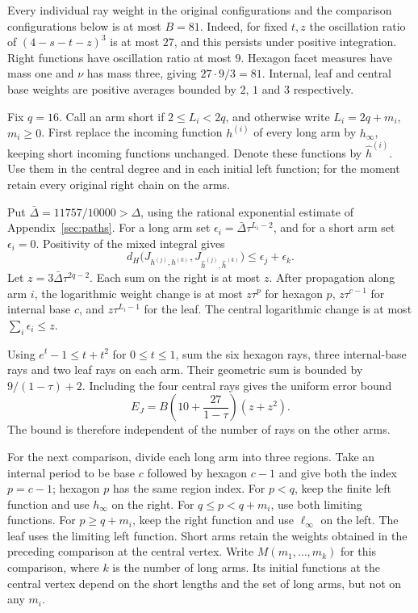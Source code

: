 Every individual ray weight in the original configurations and the
comparison configurations below is at most $B=81$. Indeed, for fixed $t,z$
the oscillation ratio of $(4-s-t-z)^3$ is at most $27$, and this persists
under positive integration. Right functions have oscillation ratio
at most $9$. Hexagon facet measures have mass one and $\nu$ has mass
three, giving $27\cdot9/3=81$. Internal, leaf and central base weights
are positive averages bounded by $2$, $1$ and $3$ respectively.

Fix $q=16$. Call an arm short if $2\le L_i<2q$, and otherwise write
$L_i=2q+m_i$, $m_i\ge0$. First replace the incoming function $h^{(i)}$
of every long arm by $h_\infty$, keeping short incoming functions
unchanged. Denote these functions by $\widehat h^{(i)}$. Use them in
the central degree and in each initial left function; for the moment
retain every original right chain on the arms.

Put $\bar\Delta=11757/10000>\Delta$, using the rational exponential
estimate of Appendix~\ref{sec:paths}. For a long arm set
$\epsilon_i=\bar\Delta\tau^{L_i-2}$, and for a short arm set
$\epsilon_i=0$. Positivity of the mixed integral gives
\[
 d_H\bigl(J_{h^{(j)},h^{(k)}},
          J_{\widehat h^{(j)},\widehat h^{(k)}}\bigr)
 \le\epsilon_j+\epsilon_k.
\]
Let $z=3\bar\Delta\tau^{2q-2}$. Each sum on the right is at most $z$.
After propagation along arm $i$, the logarithmic weight change is at
most $z\tau^p$ for hexagon $p$, $z\tau^{c-1}$ for internal base $c$,
and $z\tau^{L_i-1}$ for the leaf. The central logarithmic change is
at most $\sum_i\epsilon_i\le z$.

Using $e^t-1\le t+t^2$ for $0\le t\le1$, sum the six hexagon rays,
three internal-base rays and two leaf rays on each arm. Their geometric
sum is bounded by $9/(1-\tau)+2$. Including the four central rays gives
the uniform error bound
\begin{equation}\label{spider:junction-error}
 E_J=B\left(10+\frac{27}{1-\tau}\right)(z+z^2).
\end{equation}
The bound is therefore independent of the number of rays on the other arms.

For the next comparison, divide each long arm into three regions. Take an
internal period to be base $c$ followed by hexagon $c-1$ and give both the
index $p=c-1$;
hexagon $p$ has the same region index. For $p<q$, keep the finite left
function and use $h_\infty$ on the right. For $q\le p<q+m_i$, use
both limiting functions. For $p\ge q+m_i$, keep the right function
and use $\ell_\infty$ on the left. The leaf uses the limiting left
function. Short arms retain the weights obtained in the preceding
comparison at the central vertex.
Write $M(m_1,\ldots,m_k)$ for this comparison, where $k$ is the number
of long arms. Its initial functions at the central vertex depend on the
short lengths and the set of long arms, but not on any $m_i$.

